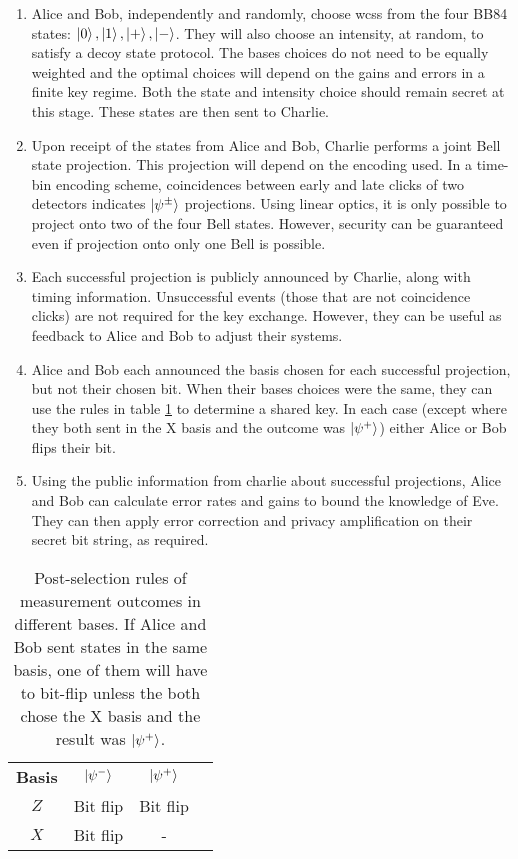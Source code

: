 \begin{enumerate}
	\item {} Alice and Bob, independently and randomly, choose \acp{wcs} from the four BB84 states: $\ket{0}, \ket{1}, \ket{+}, \ket{-}$. They will also choose an intensity, at random, to satisfy a decoy state protocol. The bases choices do not need to be equally weighted and the optimal choices will depend on the gains and errors in a finite key regime. Both the state and intensity choice should remain secret at this stage. These states are then sent to Charlie. 
	\item {} Upon receipt of the states from Alice and Bob, Charlie performs a joint Bell state projection. This projection will depend on the encoding used. In a time-bin encoding scheme, coincidences between early and late clicks of two detectors indicates $\ket{\psi^\pm}$ projections. Using linear optics, it is only possible to project onto two of the four Bell states. However, security can be guaranteed even if projection onto only one Bell is possible.
	\item {} Each successful projection is publicly announced by Charlie, along with timing information. Unsuccessful events (those that are not coincidence clicks) are not required for the key exchange. However, they can be useful as feedback to Alice and Bob to adjust their systems.
	\item {} Alice and Bob each announced the basis chosen for each successful projection, but not their chosen bit. When their bases choices were the same, they can use the rules in table \ref{tab:mdi-outcomes} to determine a shared key. In each case (except where they both sent in the X basis and the outcome was $\ket{\psi^+}$) either Alice or Bob flips their bit. 
	\item {} Using the public information from charlie about successful projections, Alice and Bob can calculate error rates and gains to bound the knowledge of Eve. They can then  apply error correction and privacy amplification on their secret bit string, as required.
\end{enumerate}

\begin{table}[tbp]
\centering
\begin{tabular}{@{}cccc@{}}
\textbf{Basis}      & $\ket{\psi^-}$     & $\ket{\psi^+}$        \\
$Z$              & Bit flip           & Bit flip                \\
$X$              & Bit flip           & \multicolumn{1}{c}{-}   \\
\end{tabular}
\caption[Measurement outcomes in MDI-QKD]{Post-selection rules of measurement outcomes in different bases. If Alice and Bob sent states in the same basis, one of them will have to bit-flip unless the both chose the X basis and the result was $\ket{\psi^+}$.}
\label{tab:mdi-outcomes}
\end{table}

